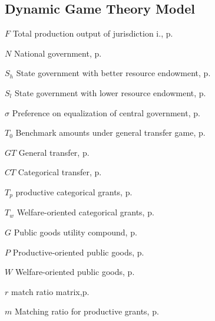 \begin{eqlist}
    \section*{ Dynamic Game Theory Model}
    \item[$F$]
    Total production output of jurisdiction i., p.~\pageref{F}

    \item[$N$]
    National government, p.~\pageref{player}

    \item[$S_h$]
    State government with better resource endowment, p.~\pageref{player}

    \item[$S_l$]
    State government with lower resource endowment, p.~\pageref{player}

    \item[$\sigma$]
    Preference on equalization of central government, p.~\pageref{player}

    \item[$T_0$]
    Benchmark amounts under general transfer game, p.~\pageref{generaltransfer}

    \item[$GT$]
    General transfer, p.~\pageref{transfer}

    \item[$CT$]
    Categorical transfer, p.~\pageref{transfer}

    \item[$T_{p}$]
    productive categorical grants, p.~\pageref{catetransfer}

    \item[$T_{w}$]
    Welfare-oriented categorical grants, p.~\pageref{catetransfer}

    \item[$G$]
    Public goods utility compound, p.~\pageref{pgmatrix}

    \item[$P$]
    Productive-oriented public goods, p.~\pageref{pgmatrix}

    \item[$W$]
    Welfare-oriented public goods, p.~\pageref{pgmatrix}

    \item[$r$]
    match ratio matrix,p.~\pageref{mrmatrix}

    \item[$m$]
    Matching ratio for productive grants, p.~\pageref{generalandcategorical}


\end{eqlist}

